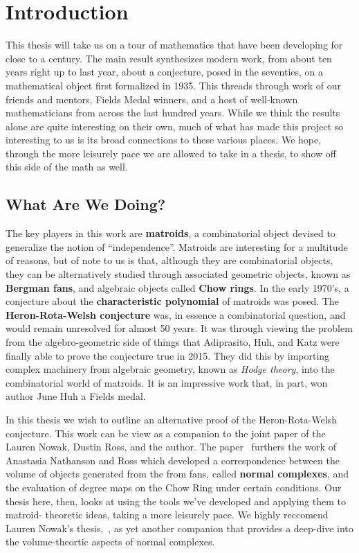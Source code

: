 \documentclass[12pt,oneside]{../../sfsuthesis}
\begin{document}
\chapter{Introduction}

This thesis will take us on a tour of mathematics that have been developing for close to a century.
The main result synthesizes modern work, from about ten years right up to last year, about a conjecture, posed in the seventies, on a mathematical object first formalized in 1935.
This threads through work of our friends and mentors, Fields Medal winners, and a host of well-known mathematicians from across the last hundred years.
While we think the results alone are quite interesting on their own, much of what has made this project so interesting to us is its broad connections to these various places.
We hope, through the more leisurely pace we are allowed to take in a thesis, to show off this side of the math as well.

\section{What Are We Doing?}

The key players in this work are \textbf{matroids}, a combinatorial object devised to generalize the notion of ``independence''.
Matroids are interesting for a multitude of reasons, but of note to us is that, although they are combinatorial objects, they can be alternatively studied through associated geometric objects, known as \textbf{Bergman fans}, and algebraic objects called \textbf{Chow rings}.
In the early 1970's, a conjecture about the \textbf{characteristic polynomial} of matroids was posed.
The \textbf{Heron-Rota-Welsh conjecture} was, in essence a combinatorial question, and would remain unresolved for almost 50 years.
It was through viewing the problem from the algebro-geometric side of things that Adiprasito, Huh, and Katz were finally able to prove the conjecture true in 2015.
They did this by importing complex machinery from algebraic geometry, known as \emph{Hodge theory}, into the combinatorial world of matroids.
It is an impressive work that, in part, won author June Huh a Fields medal.

In this thesis we wish to outline an alternative proof of the Heron-Rota-Welsh conjecture.
This work can be view as a companion to the joint paper of the Lauren Nowak, Dustin Ross, and the author.
The paper~\cite{nowakMixedVolumesNormal2023} furthers the work of Anastasia Nathanson and Ross which developed a correspondence between the volume of objects generated from the from fans, called \textbf{normal complexes}, and the evaluation of degree maps on the Chow Ring under certain conditions.
Our thesis here, then, looks at using the tools we've developed and applying them to matroid- theoretic ideas, taking a more leisurely pace.
We highly reccomend Lauren Nowak's thesis,~\cite{nowakMixedVolumesNormal2022}, as yet another companion that provides a deep-dive into the volume-theortic aspects of normal complexes.
\end{document}
